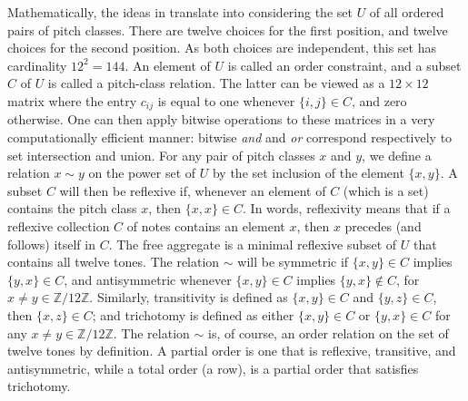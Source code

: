 Mathematically, the ideas in \cite{Starr1984} translate into considering the set $U$ of all ordered pairs of pitch classes. There are twelve choices for the first position, and twelve choices for the second position. As both choices are independent, this set has cardinality $12^2 = 144$. An element of $U$ is called an order constraint, and a subset $C$ of $U$ is called a pitch-class relation. The latter can be viewed as a $12 \times 12$ matrix where the entry $c_{ij}$ is equal to one whenever $\{ i, j \} \in C$, and zero otherwise. One can then apply bitwise operations to these matrices in a very computationally efficient manner: bitwise \emph{and} and \emph{or} correspond respectively to set intersection and union. For any pair of pitch classes $x$ and $y$, we define a relation $x \sim y$ on the power set of $U$ by the set inclusion of the element $\{ x, y \}$. A subset $C$ will then be reflexive if, whenever an element of $C$ (which is a set) contains the pitch class $x$, then $\{ x, x \} \in C$. In words, reflexivity means that if a reflexive collection $C$ of notes contains an element $x$, then $x$ precedes (and follows) itself in $C$. The free aggregate is a minimal reflexive subset of $U$ that contains all twelve tones. The relation $\sim$ will be symmetric if $\{ x, y \} \in C$ implies $\{ y, x \} \in C$, and antisymmetric whenever $\{ x, y \} \in C$ implies $\{ y, x \} \notin C$, for $x \ne y \in \mathbb{Z}/ 12 \mathbb{Z}$. Similarly, transitivity is defined as $\{ x, y \} \in C$ and $\{ y, z \} \in C$, then $\{ x, z\} \in C$; and trichotomy is defined as either $\{ x, y \} \in C$ or $\{ y, x \} \in C$ for any $x \ne y \in \mathbb{Z}/ 12 \mathbb{Z}$. The relation $\sim$ is, of course, an order relation on the set of twelve tones by definition. A partial order is one that is reflexive, transitive, and antisymmetric, while a total order (a row), is a partial order that satisfies trichotomy.


